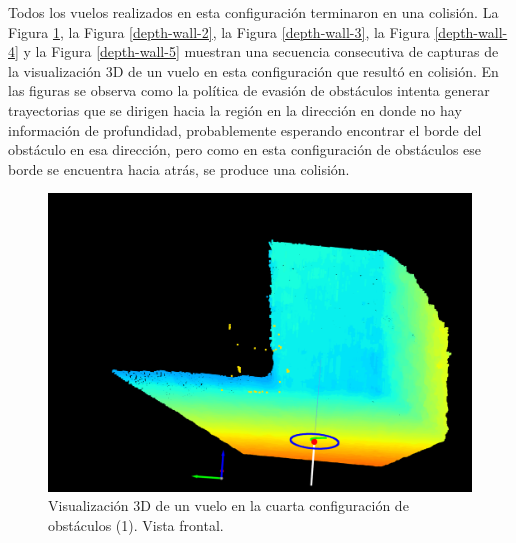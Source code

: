 Todos los vuelos realizados en esta configuración terminaron en una colisión. La Figura \ref{depth-wall-1}, la Figura \ref{depth-wall-2}, la Figura \ref{depth-wall-3}, la Figura \ref{depth-wall-4} y la Figura \ref{depth-wall-5} muestran una secuencia consecutiva de capturas de la visualización 3D de un vuelo en esta configuración que resultó en colisión. En las figuras se observa como la política de evasión de obstáculos intenta generar trayectorias que se dirigen hacia la región en la dirección  en donde no hay información de profundidad, probablemente esperando encontrar el borde del obstáculo en esa dirección, pero como en esta configuración de obstáculos ese borde se encuentra hacia atrás, se produce una colisión.

\begin{figure}[H]
    \centering
    \includegraphics[scale=0.23]{partes/img/depth-wall-1-front.png}
    \caption[Visualización 3D de un vuelo en la cuarta configuración de obstáculos (1). Vista frontal.]{Visualización 3D de un vuelo en la cuarta configuración de obstáculos (1). Vista frontal.}
    \label{depth-wall-1}
\end{figure}

